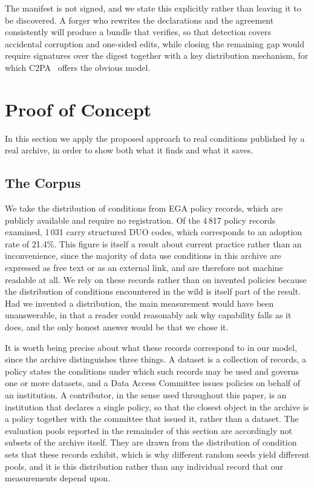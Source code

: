 \documentclass[sigconf,anonymous,review]{acmart}
\begin{document}
The manifest is not signed, and we state this explicitly rather than leaving it
to be discovered. A forger who rewrites the declarations and the agreement
consistently will produce a bundle that verifies, so that detection covers
accidental corruption and one-sided edits, while closing the remaining gap would
require signatures over the digest together with a key distribution mechanism,
for which C2PA~\cite{c2pa} offers the obvious model.

\section{Proof of Concept}
\label{sec:poc}

In this section we apply the proposed approach to real conditions published by a
real archive, in order to show both what it finds and what it saves.

\subsection{The Corpus}
\label{sec:corpus}

We take the distribution of conditions from EGA policy records, which are
publicly available and require no registration. Of the 4\,817 policy records
examined, 1\,031 carry structured DUO codes, which corresponds to an adoption
rate of 21.4\%. This figure is itself a result about current practice rather than
an inconvenience, since the majority of data use conditions in this archive are
expressed as free text or as an external link, and are therefore not machine
readable at all. We rely on these records rather than on invented policies
because the distribution of conditions encountered in the wild is itself part of
the result. Had we invented a distribution, the main measurement would have been
unanswerable, in that a reader could reasonably ask why capability falls as it
does, and the only honest answer would be that we chose it.

It is worth being precise about what these records correspond to in our model,
since the archive distinguishes three things. A dataset is a collection of
records, a policy states the conditions under which such records may be used and
governs one or more datasets, and a Data Access Committee issues policies on
behalf of an institution. A contributor, in the sense used throughout this paper,
is an institution that declares a single policy, so that the closest object in
the archive is a policy together with the committee that issued it, rather than a
dataset. The evaluation pools reported in the remainder of this section are
accordingly not subsets of the archive itself. They are drawn from the
distribution of condition sets that these records exhibit, which is why different
random seeds yield different pools, and it is this distribution rather than any
individual record that our measurements depend upon.
\end{document}
